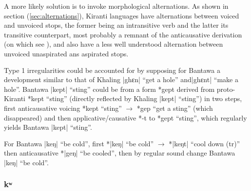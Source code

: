 \documentclass[oldfontcommands,oneside,a4paper,11pt]{article}
\newcommand{\ipa}[1]{{\phon \mbox{#1}}} %
\newcommand{\dhatu}[2]{|\ipa{#1}| ``#2''}
\begin{document}
A more likely solution is to invoke morphological alternations. As shown in section (\ref{sec:alternations}), Kiranti languages have alternations between voiced and unvoiced stops, the former being an intransitive verb and the latter its transitive counterpart, most probably a remnant of the anticausative derivation (on which see \citealt{jacques15spontaneous}), and also have a less well understood alternation between unvoiced unaspirated ans aspirated stops.

 Type 1 irregularities could be accounted for by supposing for Bantawa a development similar to that of Khaling \dhatu{ghɛn}{get a hole} and\dhatu{ghɛnt}{make a hole}. Bantawa \dhatu{kept}{sting} could be from a form *\ipa{gept} derived from proto-Kiranti *\ipa{kept} ``sting'' (directly reflected by Khaling \dhatu{kept}{sting}) in two steps, first anticausative voicing  *\ipa{kept} ``sting'' $\rightarrow$  *\ipa{gep} ``get a sting''  (which disappeared) and then applicative/causative *\ipa{-t} to *\ipa{gept} ``sting'', which regularly yields Bantawa \dhatu{kept}{sting}.
 
 For Bantawa \dhatu{keŋ}{be cold}, first *\dhatu{keŋ}{be cold} $\rightarrow$ *\dhatu{keŋt}{cool down (tr)} then anticausative *\dhatu{geŋ}{be cooled}, then by regular sound change Bantawa \dhatu{keŋ}{be cold}.

\subsubsection{\ipa{kʷ}}
\citet{opgenort04implosives}
\end{document}
